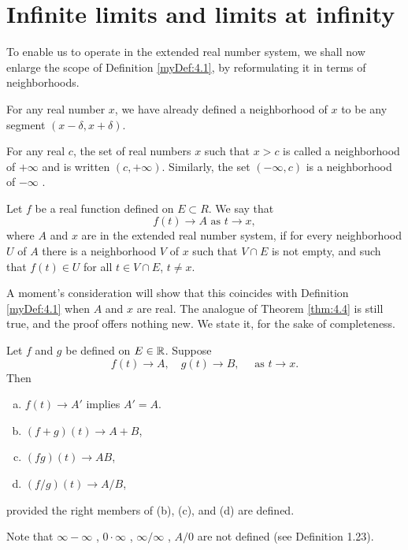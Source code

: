 \section{Infinite limits and limits at infinity}
To enable us to operate in the extended real number system, 
we shall now enlarge the scope of Definition \ref{myDef:4.1}, 
by reformulating it in terms of neighborhoods.

For any real number $x$, we have already defined a neighborhood of $x$ to
be any segment $(x - \delta, x + \delta)$.

\begin{myDef}
    \label{myDef:4.32}
    For any real $c$, the set of real numbers $x$ such that $x > c$ 
    is called a neighborhood of $+\infty$ and is written $(c, +\infty)$. 
    Similarly, the set $(-\infty , c)$ is a neighborhood of $-\infty$ .
\end{myDef}

\begin{myDef}
    \label{myDef:4.33}
    Let $f$ be a real function defined on $E \subset R$. 
    We say that 
    \begin{equation*}
        f(t) \rightarrow A \text{ as } t \rightarrow x,
    \end{equation*}
    where $A$ and $x$ are in the extended real number system, 
    if for every neighborhood $U$ of $A$ 
    there is a neighborhood $V$ of $x$ 
    such that $V \cap E$ is not empty, 
    and such that $f(t) \in U$ for all $t \in V \cap E$, $t \neq x$.
    
    A moment's consideration will show that 
    this coincides with Definition \ref{myDef:4.1} when $A$ and $x$ are real.
    The analogue of Theorem \ref{thm:4.4} is still true, 
    and the proof offers nothing new. 
    We state it, for the sake of completeness.
\end{myDef}

\begin{thm}
    \label{thm:4.34}
    Let $f$ and $g$ be defined on $E \in {\protect\mathbb R}$. Suppose
    \begin{equation*}
        f(t) \rightarrow A, \quad
        g(t) \rightarrow B, \quad
        \text{ as } t \rightarrow x.
    \end{equation*}
    Then
\begin{enumerate}[(a)]
    \item $f(t) \rightarrow A'$ implies $A' = A$.
    \item $(f + g)(t) \rightarrow A + B$,
    \item $(fg)(t) \rightarrow AB$,
    \item $(f /g)(t) \rightarrow A/B$,
\end{enumerate}
provided the right members of (b), (c), and (d) are defined.
\end{thm}

Note that $\infty  - \infty$ , $0 \cdot \infty$ , $\infty /\infty$ , 
$A/0$ are not defined (see Definition 1.23).